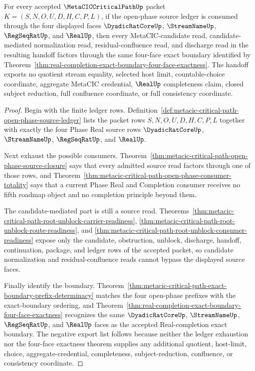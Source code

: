 \begin{theorem}
\label{thm:metacic-critical-path-open-phase-exact-boundary-handoff}
For every accepted $\MetaCICCriticalPathUp$ packet $K=(S,N,O,U,D,H,C,P,L)$, if the open-phase source ledger is consumed through the four displayed faces $\DyadicRatCoreUp$, $\StreamNameUp$, $\RegSeqRatUp$, and $\RealUp$, then every MetaCIC-candidate read, candidate-mediated normalization read, residual-confluence read, and discharge read in the resulting handoff factors through the same four-face exact boundary identified by Theorem~\ref{thm:real-completion-exact-boundary-four-face-exactness}. The handoff exports no quotient stream equality, selected host limit, countable-choice coordinate, aggregate MetaCIC credential, $\RealUp$ completeness claim, closed subject reduction, full confluence coordinate, or full consistency coordinate.
\end{theorem}
\begin{proof}
Begin with the finite ledger rows. Definition~\ref{def:metacic-critical-path-open-phase-source-ledger} lists the packet rows $S,N,O,U,D,H,C,P,L$ together with exactly the four Phase Real source rows $\DyadicRatCoreUp$, $\StreamNameUp$, $\RegSeqRatUp$, and $\RealUp$.

Next exhaust the possible consumers. Theorem~\ref{thm:metacic-critical-path-open-phase-source-closure} says that every admitted source read factors through one of those rows, and Theorem~\ref{thm:metacic-critical-path-open-phase-consumer-totality} says that a current Phase Real and Completion consumer receives no fifth roadmap object and no completion principle beyond them.

The candidate-mediated part is still a source read. Theorems~\ref{thm:metacic-critical-path-root-unblock-carrier-readiness}, \ref{thm:metacic-critical-path-root-unblock-route-readiness}, and \ref{thm:metacic-critical-path-root-unblock-consumer-readiness} expose only the candidate, obstruction, unblock, discharge, handoff, continuation, package, and ledger rows of the accepted packet, so candidate normalization and residual-confluence reads cannot bypass the displayed source faces.

Finally identify the boundary. Theorem~\ref{thm:metacic-critical-path-exact-boundary-prefix-determinacy} matches the four open-phase prefixes with the exact-boundary ordering, and Theorem~\ref{thm:real-completion-exact-boundary-four-face-exactness} recognizes the same $\DyadicRatCoreUp$, $\StreamNameUp$, $\RegSeqRatUp$, and $\RealUp$ faces as the accepted Real-completion exact boundary. The negative export list follows because neither the ledger exhaustion nor the four-face exactness theorem supplies any additional quotient, host-limit, choice, aggregate-credential, completeness, subject-reduction, confluence, or consistency coordinate.
\end{proof}
